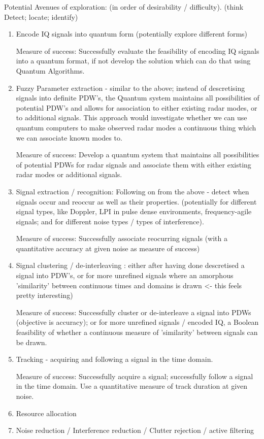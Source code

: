 Potential Avenues of exploration: (in order of desirability / difficulty). (think Detect; locate; identify)
\begin{enumerate}
    \item Encode IQ signals into quantum form (potentially explore different forms)
    
    Measure of success: Successfully evaluate the feasibility of encoding IQ signals into a quantum format, if not develop the solution which can do that using Quantum Algorithms.
    
    \item Fuzzy Parameter extraction - similar to the above; instead of descretising signals into definite PDW's, the Quantum system maintains all possibilities of potential PDW's and allows for association to either existing radar modes, or to additional signals. This approach would investigate whether we can use quantum computers to make observed radar modes a continuous thing which we can associate known modes to.
    
    Measure of success: Develop a quantum system that maintains all possibilities of potential PDWs for radar signals and associate them with either existing radar modes or additional signals. 
    
    \item Signal extraction / recognition: Following on from the above - detect when signals occur and reoccur as well as their properties. (potentially for different signal types, like Doppler, LPI in pulse dense environments, frequency-agile signals; and for different noise types / types of interference).

    Measure of success: Successfully associate reocurring signals (with a quantitative accuracy at given noise as measure of success) 
    
    \item Signal clustering / de-interleaving : either after having done descretised a signal into PDW's, or for more unrefined signals where an amorphous 'similarity' between continuous times and domains is drawn <- this feels pretty interesting)

    Measure of success: Successfully cluster or de-interleave a signal into PDWs (objective is accuracy); or for more unrefined signals / encoded IQ, a Boolean feasibility of whether a continuous measure of 'similarity' between signals can be drawn.
    
    \item Tracking - acquiring and following a signal in the time domain.

    Measure of success: Successfully acquire a signal; successfully follow a signal in the time domain. Use a quantitative measure of track duration at given noise.
    
    \item Resource allocation
    
    \item Noise reduction / Interference reduction / Clutter rejection / active filtering
\end{enumerate}
